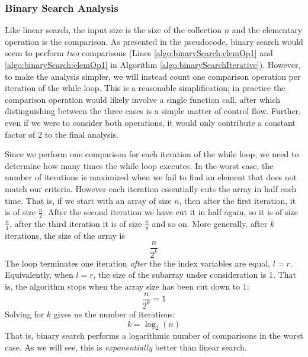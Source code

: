 \subsubsection{Binary Search Analysis}

Like linear search, the input size is the size of the collection $n$ and the
elementary operation is the comparison.  As presented in the pseudocode, 
binary search would seem to perform \emph{two} comparisons (Lines
\ref{algo:binarySearch:elemOp1} and \ref{algo:binarySearch:elemOp1} in Algorithm
\ref{algo:binarySearchIterative}).  However, to make the analysis simpler, we
will instead count one comparison operation per iteration of the 
while loop.  This is a reasonable simplification; in practice the comparison
operation would likely involve a single function call, after which 
distinguishing between the three cases is a simple matter of control flow.
Further, even if we were to consider both operations, it would only contribute
a constant factor of 2 to the final analysis.

Since we perform one comparison for each iteration of the while loop, we need
to determine how many times the while loop executes.  In the worst case, the
number of iterations is maximized when we fail to find an element that does
not match our criteria.  However each iteration essentially cuts the array in
half each time.  That is, if we start with an array of size $n$, then after the 
first iteration, it is of size $\frac{n}{2}$.  After the second iteration
we have cut it in half again, so it is of size $\frac{n}{4}$, after the third
iteration it is of size $\frac{n}{8}$ and so on.  More generally, after
$k$ iterations, the size of the array is
  $$\frac{n}{2^k}$$
The loop terminates one iteration \emph{after} the the index variables are 
equal, $l = r$.  Equivalently, when $l = r$, the size of the subarray under consideration is 1.  That is, the algorithm stops when the array size has
been cut down to 1:
  $$\frac{n}{2^k} = 1$$
Solving for $k$ gives us the number of iterations:
  $$k = \log_2{(n)}$$
That is, binary search performs a logarithmic number of comparisons in the worst
case.  As we will see, this is \emph{exponentially} better than linear search.

